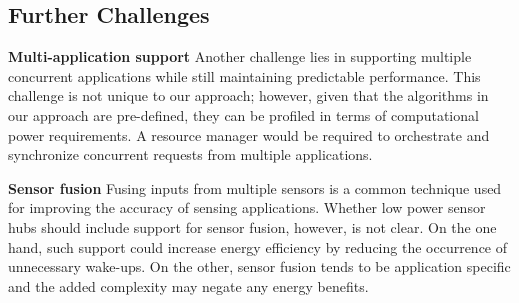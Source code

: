 \subsection{Further Challenges}
\label{sec:furtherChallenges}

{\bf Multi-application support} Another challenge lies in supporting
multiple concurrent applications while still maintaining predictable
performance.  This challenge is not unique to our approach; however,
given that the algorithms in our approach are pre-defined, they can be
profiled in terms of computational power requirements.  A resource
manager would be required to orchestrate and synchronize concurrent
requests from multiple applications.

{\bf Sensor fusion} Fusing inputs from multiple sensors is a common
technique used for improving the accuracy of sensing applications.
Whether low power sensor hubs should include support for sensor
fusion, however, is not clear.  On the one hand, such support could
increase energy efficiency by reducing the occurrence of unnecessary
wake-ups.  On the other, sensor fusion tends to be application specific
and the added complexity may negate any energy benefits.
